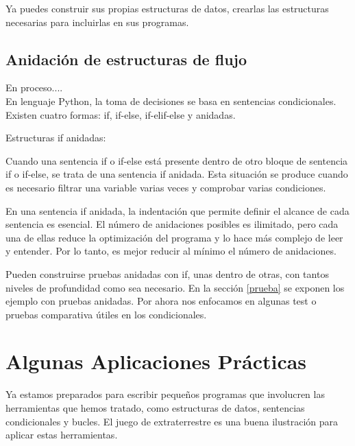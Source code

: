 Ya puedes construir sus propias estructuras de datos, crearlas las estructuras necesarias  para incluirlas en sus programas.

\subsection{Anidación de estructuras de flujo}

En proceso....\\

En lenguaje Python, la toma de decisiones se basa en sentencias condicionales.
Existen cuatro formas: {\ttfamily if}, {\ttfamily if-else},   {\ttfamily if-elif-else} y anidadas.



Estructuras  {\ttfamily if} anidadas:

Cuando una sentencia {\ttfamily if} o {\ttfamily if-else} está presente dentro de otro bloque de sentencia {\ttfamily if} o {\ttfamily if-else}, se trata de una sentencia  {\ttfamily if} anidada. Esta situación se produce cuando es necesario filtrar una variable varias veces y comprobar varias condiciones.

En una sentencia  {\ttfamily if} anidada, la indentación que permite definir el alcance de cada sentencia es esencial. El número de anidaciones posibles es ilimitado, pero cada una de ellas reduce la optimización del programa y lo hace más complejo de leer y entender. Por lo tanto, es mejor reducir al mínimo el número de anidaciones.



Pueden construirse pruebas anidadas con {\ttfamily if}, unas dentro de otras, con tantos niveles de profundidad como sea necesario. En la sección \ref{prueba} se exponen los ejemplo con pruebas anidadas. Por ahora nos enfocamos en algunas test o pruebas comparativa útiles en los condicionales.  



\section{Algunas Aplicaciones Prácticas}\label{aplicaciones}
Ya estamos preparados para escribir pequeños programas que involucren las herramientas que hemos tratado, como estructuras de datos, sentencias condicionales y bucles. El juego de extraterrestre es una buena ilustración para aplicar estas herramientas. 

